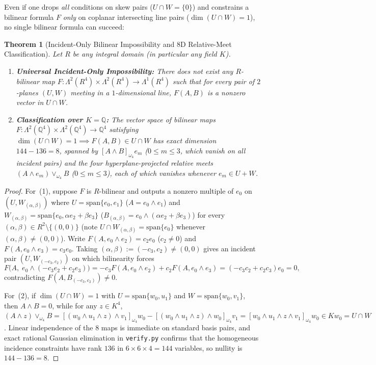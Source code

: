 \documentclass[11pt]{article}
\newtheorem{theorem}{Theorem}[section]
\theoremstyle{definition}
\newcommand{\spn}{\mathrm{span}}
\begin{document}
Even if one drops \emph{all} conditions on skew pairs ($U \cap W = \{0\}$) and constrains a bilinear formula $F$ \emph{only} on coplanar intersecting line pairs ($\dim(U \cap W) = 1$), no single bilinear formula can succeed:

\begin{theorem}[Incident-Only Bilinear Impossibility and $8$D Relative-Meet Classification]\label{thm:r2-incident}
Let $R$ be any integral domain (in particular any field $K$).
\begin{enumerate}
  \item \textbf{Universal Incident-Only Impossibility:} There does \emph{not} exist any $R$-bilinear map $F : \Lambda^2(R^4) \times \Lambda^2(R^4) \to \Lambda^1(R^4)$ such that for every pair of $2$-planes $(U, W)$ meeting in a $1$-dimensional line, $F(A, B)$ is a nonzero vector in $U \cap W$.
  \item \textbf{Classification over $K = \mathbb{Q}$:} The vector space of bilinear maps $F : \Lambda^2(\mathbb{Q}^4) \times \Lambda^2(\mathbb{Q}^4) \to \mathbb{Q}^4$ satisfying $\dim(U \cap W) = 1 \implies F(A, B) \in U \cap W$ has exact dimension $144 - 136 = 8$, spanned by $[A \wedge B]_{\omega_4} e_m$ ($0 \le m \le 3$, which vanish on all incident pairs) and the four hyperplane-projected relative meets $(A \wedge e_m) \vee_{\omega_4} B$ ($0 \le m \le 3$), each of which vanishes whenever $e_m \in U + W$.
\end{enumerate}
\end{theorem}
\begin{proof}
For~(1), suppose $F$ is $R$-bilinear and outputs a nonzero multiple of $e_0$ on $(U, W_{(\alpha,\beta)})$ where $U = \spn\{e_0, e_1\}$ ($A = e_0 \wedge e_1$) and $W_{(\alpha,\beta)} = \spn\{e_0, \alpha e_2 + \beta e_3\}$ ($B_{(\alpha,\beta)} = e_0 \wedge (\alpha e_2 + \beta e_3)$) for every $(\alpha, \beta) \in R^2 \setminus \{(0,0)\}$ (note $U \cap W_{(\alpha,\beta)} = \spn\{e_0\}$ whenever $(\alpha,\beta) \neq (0,0)$). Write $F(A, e_0 \wedge e_2) = c_2 e_0$ ($c_2 \neq 0$) and $F(A, e_0 \wedge e_3) = c_3 e_0$. Taking $(\alpha, \beta) := (-c_3, c_2) \neq (0,0)$ gives an incident pair $(U, W_{(-c_3, c_2)})$ on which bilinearity forces
\[
  F\bigl(A,\; e_0 \wedge (-c_3 e_2 + c_2 e_3)\bigr)
  = -c_3 F(A, e_0 \wedge e_2) + c_2 F(A, e_0 \wedge e_3) = (-c_3 c_2 + c_2 c_3) e_0 = 0,
\]
contradicting $F(A, B_{(-c_3, c_2)}) \neq 0$.

For~(2), if $\dim(U \cap W) = 1$ with $U = \spn\{w_0, u_1\}$ and $W = \spn\{w_0, v_1\}$, then $A \wedge B = 0$, while for any $z \in K^4$, $(A \wedge z) \vee_{\omega_4} B = [(w_0 \wedge u_1 \wedge z) \wedge v_1]_{\omega_4} w_0 - [(w_0 \wedge u_1 \wedge z) \wedge w_0]_{\omega_4} v_1 = [w_0 \wedge u_1 \wedge z \wedge v_1]_{\omega_4} w_0 \in K w_0 = U \cap W$. Linear independence of the $8$ maps is immediate on standard basis pairs, and exact rational Gaussian elimination in \texttt{verify.py} confirms that the homogeneous incidence constraints have rank $136$ in $6 \times 6 \times 4 = 144$ variables, so nullity is $144 - 136 = 8$.
\end{proof}
\end{document}
